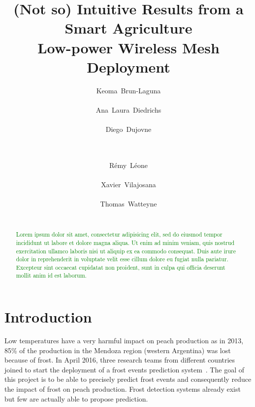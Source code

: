 \documentclass{sig-alternate}
\newcommand{\lorem}          {\textcolor{green}{Lorem ipsum dolor sit amet, consectetur adipisicing elit, sed do eiusmod tempor incididunt ut labore et dolore magna aliqua. Ut enim ad minim veniam, quis nostrud exercitation ullamco laboris nisi ut aliquip ex ea commodo consequat. Duis aute irure dolor in reprehenderit in voluptate velit esse cillum dolore eu fugiat nulla pariatur. Excepteur sint occaecat cupidatat non proident, sunt in culpa qui officia deserunt mollit anim id est laborum.}}
\begin{document}
\title{(Not so) Intuitive Results from a Smart Agriculture\\Low-power Wireless Mesh Deployment}

\author{
    \alignauthor Keoma~Brun-Laguna\\
        \\
    \alignauthor Ana~Laura~Diedrichs\\
        \\
    \alignauthor Diego~Dujovne\\
        \\
        \\
    \and
    \alignauthor R\'emy~L\'eone\\
        \\
    \alignauthor Xavier~Vilajosana\\
        \\
    \alignauthor Thomas~Watteyne\\
        \\
}

\maketitle

\begin{abstract}
\lorem
\end{abstract}

\section{Introduction}
\label{sec:intro}


Low temperatures have a very harmful impact on peach production as in 2013, 85\% of the production in the Mendoza region (western Argentina) was lost because of frost.
In April 2016, three research teams from different countries joined to start the deployment of a frost events prediction system~\cite{watteyne16peach}.
The goal of this project is to be able to precisely predict frost events and consequently reduce the impact of frost on peach production.
Frost detection systems already exist but few are actually able to propose prediction.
\end{document}
